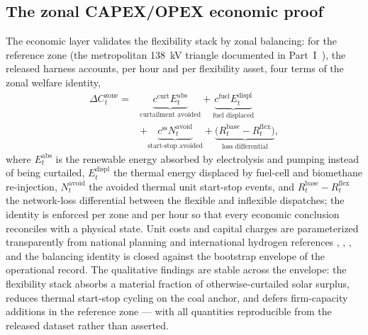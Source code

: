 \subsection{The zonal CAPEX/OPEX economic proof}
\label{sub:zonal}

The economic layer validates the flexibility stack by zonal balancing: for the reference zone (the metropolitan 138~kV triangle documented in Part~I~\cite{seni142part1}), the released harness accounts, per hour and per flexibility asset, four terms of the zonal welfare identity,
\begin{equation}
\begin{aligned}
\Delta C^{\mathrm{zone}}_t = {}& \underbrace{c^{\mathrm{curt}} E^{\mathrm{abs}}_t}_{\text{curtailment avoided}} + \underbrace{c^{\mathrm{fuel}} E^{\mathrm{displ}}_t}_{\text{fuel displaced}} \\
& + \underbrace{c^{\mathrm{ss}} N^{\mathrm{avoid}}_t}_{\text{start-stop avoided}} + \underbrace{\big(R^{\mathrm{base}}_t - R^{\mathrm{flex}}_t\big)}_{\text{loss differential}},
\end{aligned}
\label{eq:zonal}
\end{equation}
where $E^{\mathrm{abs}}_t$ is the renewable energy absorbed by electrolysis and pumping instead of being curtailed, $E^{\mathrm{displ}}_t$ the thermal energy displaced by fuel-cell and biomethane re-injection, $N^{\mathrm{avoid}}_t$ the avoided thermal unit start-stop events, and $R^{\mathrm{base}}_t - R^{\mathrm{flex}}_t$ the network-loss differential between the flexible and inflexible dispatches; the identity is enforced per zone and per hour so that every economic conclusion reconciles with a physical state. Unit costs and capital charges are parameterized transparently from national planning and international hydrogen references \cite{cne2022}, \cite{irena2020}, \cite{iea2023}, and the balancing identity is closed against the bootstrap envelope of the operational record. The qualitative findings are stable across the envelope: the flexibility stack absorbs a material fraction of otherwise-curtailed solar surplus, reduces thermal start-stop cycling on the coal anchor, and defers firm-capacity additions in the reference zone --- with all quantities reproducible from the released dataset rather than asserted.
